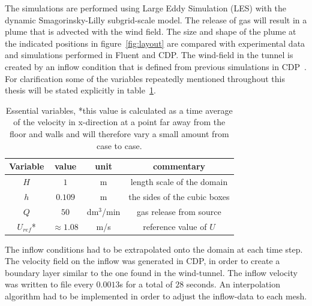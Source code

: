 The simulations are performed using Large Eddy Simulation (LES) 
with the dynamic Smagorinsky-Lilly subgrid-scale model. 
The release of gas will result in a plume that is advected with the wind field. The size and 
shape of the plume at the indicated positions in figure~\ref{fig:layout} are compared with 
experimental data and simulations performed in Fluent and CDP\@. 
The wind-field in the tunnel is created by an inflow condition that is defined from previous 
simulations in CDP~\cite{eriksson}.
For clarification some of the variables repeatedly mentioned throughout this thesis will be 
stated explicitly in table~\ref{tab:simplevariables}.
\begin{table}
    \centering
    \begin{tabular}{c c c c}
        Variable & value & unit & commentary \\ \hline
        $H$   & $1$ & m & length scale of the domain \\ 
        $h$   & $0.109$ & m & the sides of the cubic boxes\\ 
        $Q$   & $50$ & dm$^3$/min & gas release from source \\ 
        $U_{ref} $*& $\approx1.08$ & m/s & reference value of $U$ \\
    \end{tabular}
    \caption{Essential variables, *this value is calculated as a time average of the velocity in 
        x-direction at a point far away from the floor and walls and will therefore 
        vary a small amount from case to case. }
    \label{tab:simplevariables}
\end{table}

The inflow conditions had to be extrapolated onto the domain at each time step. The velocity field
on the inflow was generated in CDP, in order to create a boundary layer similar to the one found
in the wind-tunnel. The inflow velocity was written to file every 
$0.0013$s for a total of $28$ seconds. An interpolation algorithm had to be implemented in order
to adjust the inflow-data to each mesh.

